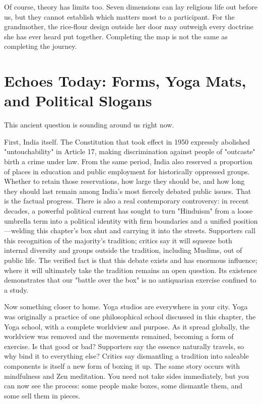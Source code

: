 Of course, theory has limits too. Seven dimensions can lay religious life out before us, but they cannot establish which matters most to a participant. For the grandmother, the rice-flour design outside her door may outweigh every doctrine she has ever heard put together. Completing the map is not the same as completing the journey.

\section[Today: Forms, Yoga, and Politics]{Echoes Today: Forms, Yoga Mats, and Political Slogans}
This ancient question is sounding around us right now.

First, India itself. The Constitution that took effect in 1950 expressly abolished "untouchability" in Article 17, making discrimination against people of "outcaste" birth a crime under law. From the same period, India also reserved a proportion of places in education and public employment for historically oppressed groups. Whether to retain those reservations, how large they should be, and how long they should last remain among India's most fiercely debated public issues. That is the factual progress. There is also a real contemporary controversy: in recent decades, a powerful political current has sought to turn "Hinduism" from a loose umbrella term into a political identity with firm boundaries and a unified position---welding this chapter's box shut and carrying it into the streets. Supporters call this recognition of the majority's tradition; critics say it will squeeze both internal diversity and groups outside the tradition, including Muslims, out of public life. The verified fact is that this debate exists and has enormous influence; where it will ultimately take the tradition remains an open question. Its existence demonstrates that our "battle over the box" is no antiquarian exercise confined to a study.

Now something closer to home. Yoga studios are everywhere in your city. Yoga was originally a practice of one philosophical school discussed in this chapter, the Yoga school, with a complete worldview and purpose. As it spread globally, the worldview was removed and the movements remained, becoming a form of exercise. Is that good or bad? Supporters say the essence naturally travels, so why bind it to everything else? Critics say dismantling a tradition into saleable components is itself a new form of boxing it up. The same story occurs with mindfulness and Zen meditation. You need not take sides immediately, but you can now see the process: some people make boxes, some dismantle them, and some sell them in pieces.

